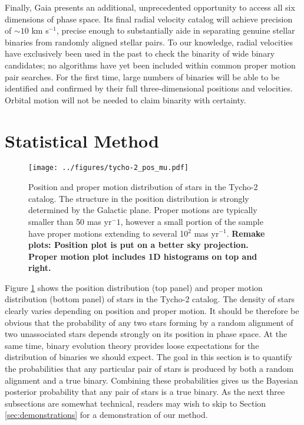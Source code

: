 \documentclass[usenatbib]{mnras}
\begin{document}
Finally, Gaia presents an additional, unprecedented opportunity to access all six dimensions of phase space. Its final radial velocity catalog will achieve precision of $\sim 10$ km s$^{-1}$, precise enough to substantially aide in separating genuine stellar binaries from randomly aligned stellar pairs. To our knowledge, radial velocities have exclusively been used in the past to check the binarity of wide binary candidates; no algorithms have yet been included within common proper motion pair searches. For the first time, large numbers of binaries will be able to be identified and confirmed by their full three-dimensional positions and velocities. Orbital motion will not be needed to claim binarity with certainty.


\section{Statistical Method}


\begin{figure}
\begin{center}
\texttt{[image: ../figures/tycho-2\_pos\_mu.pdf]}
\caption{ Position and proper motion distribution of stars in the Tycho-2 catalog. The structure in the position distribution is strongly determined by the Galactic plane. Proper motions are typically smaller than 50 mas yr$^-1$, however a small portion of the sample have proper motions extending to several 10$^2$ mas yr$^{-1}$. {\bf Remake plots: Position plot is put on a better sky projection. Proper motion plot includes 1D histograms on top and right.}}
\label{fig:tycho-2_pos_mu}
\end{center}
\end{figure}


Figure \ref{fig:tycho-2_pos_mu} shows the position distribution (top panel) and proper motion distribution (bottom panel) of stars in the Tycho-2 catalog. The density of stars clearly varies depending on position and proper motion. It should be therefore be obvious that the probability of any two stars forming by a random alignment of two unassociated stars depends strongly on its position in phase space. At the same time, binary evolution theory provides loose expectations for the distribution of binaries we should expect. The goal in this section is to quantify the probabilities that any particular pair of stars is produced by both a random alignment and a true binary. Combining these probabilities gives us the Bayesian posterior probability that any pair of stars is a true binary. As the next three subsections are somewhat technical, readers may wish to skip to Section \ref{sec:demonstrations} for a demonstration of our method.
\end{document}
